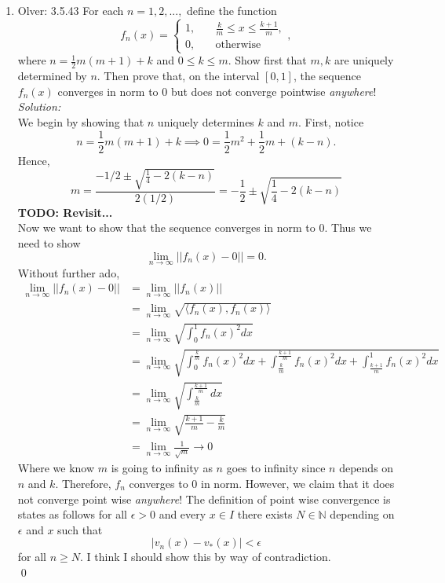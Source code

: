 \documentclass[10pt]{amsart}
\theoremstyle{nonumberplain}
\begin{document}
\begin{enumerate}[label={\bf {\arabic*}:}]
\newpage


\item Olver: 3.5.43 For each $n = 1, 2, ..., $ define the function
$$
f_n(x) = \begin{cases} 1, \quad &\frac k m \leq x \leq \frac {k + 1} m, \\ 0, \quad & \text{otherwise}\end{cases},
$$
where $n = \frac 1 2 m (m + 1) + k$ and $0 \leq k \leq m$.
Show first that $m, k$ are uniquely determined by $n$.
Then prove that, on the interval $[0, 1]$, the sequence $f_n(x)$ converges in norm to 0 but does not converge pointwise \textit{anywhere}! \\

\noindent
\textit{Solution:} \\
We begin by showing that $n$ uniquely determines $k$ and $m$.
First, notice
$$
n = \frac 1 2 m(m + 1) + k \implies 0 = \frac 1 2 m^2 + \frac 1 2 m + (k - n).
$$
Hence,
$$
m = \frac {-1/2 \pm \sqrt{\frac 1 4 - 2(k - n)} }{2 (1/2)} = -\frac 1 2 \pm \sqrt{\frac 1 4 - 2(k - n)}
$$
\textbf{TODO: Revisit...} \\

\noindent
Now we want to show that the sequence converges in norm to 0.
Thus we need to show
$$
\lim_{n \rightarrow \infty} ||f_n(x) - 0|| = 0.
$$
Without further ado,
\begin{align*}
\lim_{n \rightarrow \infty} ||f_n(x) - 0|| &= \lim_{n \rightarrow \infty} ||f_n(x)|| \\
	&= \lim_{n \rightarrow \infty} \sqrt{ \langle  f_n(x), f_n(x) \rangle} \\
	&= \lim_{n \rightarrow \infty} \sqrt{ \int_0^1  f_n(x)^2 dx } \\
	&= \lim_{n \rightarrow \infty} \sqrt{
		\int_0^{\frac k m }  f_n(x)^2 dx
		+ \int_{\frac k m }^{\frac {k + 1} m }  f_n(x)^2 dx 
		+ \int_{\frac {k + 1} m }^1  f_n(x)^2 dx} \\
	&= \lim_{n \rightarrow \infty} \sqrt{\int_{\frac k m }^{\frac {k + 1} m } dx } \\
	&= \lim_{n \rightarrow \infty} \sqrt{ \frac {k + 1} m - \frac k m } \\
	&= \lim_{n \rightarrow \infty} \frac 1 {\sqrt{m }} \rightarrow 0
\end{align*}
Where we know $m$ is going to infinity as $n$ goes to infinity since $n$ depends on $n$ and $k$.
Therefore, $f_n$ converges to 0 in norm.
However, we claim that it does not converge point wise \textit{anywhere}!
The definition of point wise convergence is states as follows for all $\epsilon > 0$ and every $x \in I$ there exists $N \in \mathbb N$ depending on $\epsilon$ and $x$ such that
$$
| v_n(x) - v_*(x)| < \epsilon
$$
for all $n \geq N$.
I think I should show this by way of contradiction. \\
\qed \\


\end{enumerate}
\end{document}
